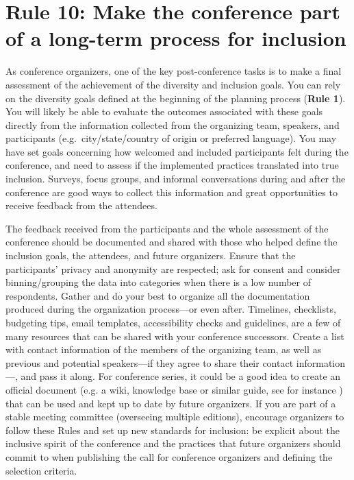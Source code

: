 \documentclass[10pt,letterpaper]{article}
\begin{document}
\section*{Rule 10: Make the conference part of a long-term process for inclusion}
\label{rule_process}

As conference organizers, one of the key post-conference tasks is to make a final assessment of the achievement of the diversity and inclusion goals. 
You can rely on the diversity goals defined at the beginning of the planning process (\textbf{Rule 1}). 
You will likely be able to evaluate the outcomes associated with these goals directly from the information collected from the organizing team, speakers, and participants (e.g.\ city/state/country of origin or preferred language).
You may have set goals concerning how welcomed and included participants felt during the conference, and need to assess if the implemented practices translated into true inclusion. 
Surveys, focus groups, and informal conversations during and after the conference are good ways to collect this information and great opportunities to receive feedback from the attendees.

The feedback received from the participants and the whole assessment of the conference should be documented and shared with those who helped define the inclusion goals, the attendees, and future organizers. 
Ensure that the participants' privacy and anonymity are respected; ask for consent and consider binning/grouping the data into categories when there is a low number of respondents.
Gather and do your best to organize all the documentation produced during the organization process---or even after. Timelines, checklists, budgeting tips, email templates, accessibility checks and guidelines, are a few of many resources that can be shared with your conference successors. 
Create a list with contact information of the members of the organizing team, as well as previous and potential speakers---if they agree to share their contact information---, and pass it along.
For conference series, it could be a good idea to create an official document (e.g. a wiki, knowledge base or similar guide, see for instance \cite{sanchez-tapia_user_2021-2}) that can be used and kept up to date by future organizers.
If you are part of a stable meeting committee (overseeing multiple editions), encourage organizers to follow these Rules and set up new standards for inclusion: be explicit about the inclusive spirit of the conference and the practices that future organizers should commit to when publishing the call for conference organizers and defining the selection criteria. 
\end{document}
